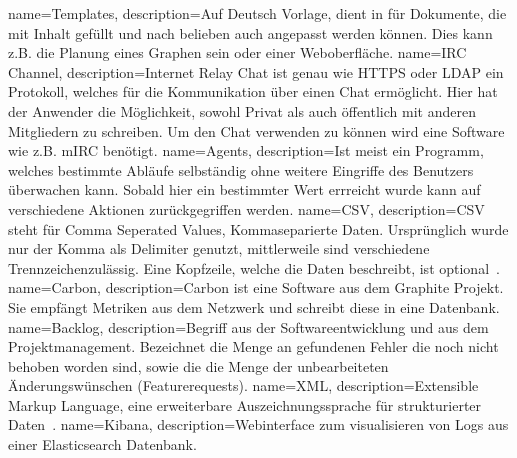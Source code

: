 {
  name=Templates,
  description={Auf Deutsch Vorlage, dient in für Dokumente, die mit Inhalt gefüllt
              und nach belieben auch angepasst werden können. Dies kann z.B. die
              Planung eines Graphen sein oder einer Weboberfläche.}
}
{
  name=IRC Channel,
  description={Internet Relay Chat ist genau wie \gls{HTTPS} oder \gls{LDAP}
              ein Protokoll, welches für die Kommunikation über einen Chat
              ermöglicht. Hier hat der Anwender die Möglichkeit, sowohl
              Privat als auch öffentlich mit anderen Mitgliedern zu schreiben.
              Um den Chat verwenden zu können wird eine Software wie z.B.
              mIRC benötigt.}
}
{
  name=Agents,
  description={Ist meist ein Programm, welches bestimmte Abläufe selbständig
              ohne weitere Eingriffe des Benutzers überwachen kann. Sobald
              hier ein bestimmter Wert errreicht wurde kann auf
              verschiedene Aktionen zurückgegriffen werden.}
}
{
  name=CSV,
  description={CSV steht für Comma Seperated Values, Kommaseparierte Daten.
              Ursprünglich wurde nur der Komma als Delimiter genutzt,
              mittlerweile sind verschiedene Trennzeichenzulässig. Eine
              Kopfzeile, welche die Daten beschreibt, ist optional~\cite{RFC4180}.}
}
{
  name=Carbon,
  description={Carbon ist eine Software aus dem Graphite Projekt. Sie empfängt
               Metriken aus dem Netzwerk und schreibt diese in eine Datenbank.}
}
{
  name=Backlog,
  description={Begriff aus der Softwareentwicklung und aus dem Projektmanagement.
               Bezeichnet die Menge an gefundenen Fehler die noch nicht behoben
               worden sind, sowie die die Menge der unbearbeiteten
               Änderungswünschen (Featurerequests).}
}
{
  name=XML,
  description={Extensible Markup Language, eine erweiterbare Auszeichnungssprache
               für strukturierter Daten~\cite{xml_definition}.}
}
{
  name=Kibana,
  description={Webinterface zum visualisieren von Logs aus einer Elasticsearch
               Datenbank.}
}
